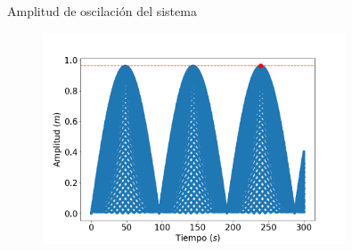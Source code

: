\begin{frame}{Amplitud de oscilación del sistema}
    \begin{minipage}[c]{0.8\linewidth}
        \begin{figure}[H]
            \centering
            \includegraphics[width=0.8\textwidth]{pic/05-results/system_amplitude}
            \label{fig:system-amplitude}
        \end{figure}
    \end{minipage}
    \begin{minipage}{0.15\linewidth}
        \large{}
    \end{minipage}
\end{frame}


